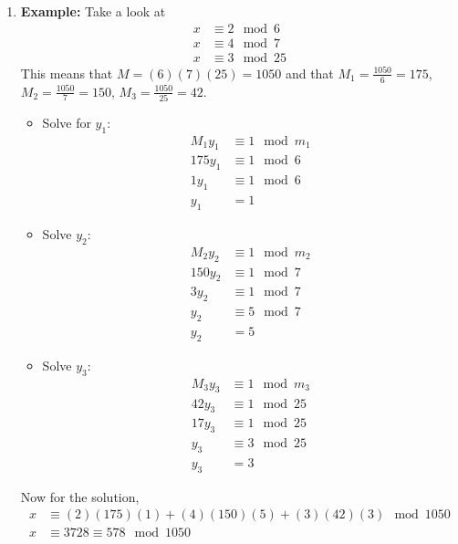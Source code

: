 \documentclass[class=article, crop=false]{standalone}
\begin{document}
\begin{enumerate}[1.]
	\item \textbf{Example:} Take a look at
	\begin{align*}
		x &\equiv 2\mod 6 \\
		x &\equiv 4\mod 7 \\
		x &\equiv 3\mod 25
	\end{align*}
	This means that $M=(6)(7)(25)=1050$ and that $M_1 = \frac{1050}{6}=175$, $M_2 = \frac{1050}{7}=150$,
	$M_3 = \frac{1050}{25}=42$.
	\begin{itemize}
		\item[] Solve for $y_1$:
		\begin{align*}
			M_1 y_1 &\equiv 1\mod m_1 \\
			175 y_1 &\equiv 1\mod 6 \\
			1y_1 &\equiv 1\mod 6 \\
			y_1 &= 1
		\end{align*}
		
		\item[] Solve $y_2$: \begin{align*}
			M_2 y_2 &\equiv 1\mod m_2 \\
			150 y_2 &\equiv 1\mod 7 \\
			3y_2 &\equiv 1\mod 7 \\
			y_2 &\equiv 5\mod 7 \\
			y_2 &= 5
		\end{align*}

		\item[] Solve $y_3$: \begin{align*}
			M_3 y_3 &\equiv 1\mod m_3 \\
			42 y_3 &\equiv 1\mod 25 \\
			17y_3 &\equiv 1\mod 25 \\
			y_3 &\equiv 3\mod 25 \\
			y_3 &= 3
		\end{align*}
	\end{itemize}
	Now for the solution,
	\begin{align*}
		x&\equiv(2)(175)(1) + (4)(150)(5) + (3)(42)(3)\mod 1050 \\
		x &\equiv 3728\equiv 578\mod 1050
	\end{align*}
	
\end{enumerate}

\end{document}
